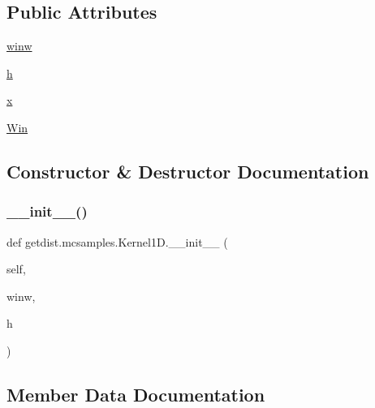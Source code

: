 \subsection*{Public Attributes}
\begin{DoxyCompactItemize}
\item 
\mbox{\hyperlink{classgetdist_1_1mcsamples_1_1Kernel1D_a897ce9e9a0b0f403e8d6111badf3a2cf}{winw}}
\item 
\mbox{\hyperlink{classgetdist_1_1mcsamples_1_1Kernel1D_a95db9c9ddddc733eace8160174ec27dd}{h}}
\item 
\mbox{\hyperlink{classgetdist_1_1mcsamples_1_1Kernel1D_a8b93d07c294c35dbff6871069a05c16c}{x}}
\item 
\mbox{\hyperlink{classgetdist_1_1mcsamples_1_1Kernel1D_a9c7890245179ab18b53b4396ed95a7fc}{Win}}
\end{DoxyCompactItemize}


\subsection{Constructor \& Destructor Documentation}
\mbox{\label{classgetdist_1_1mcsamples_1_1Kernel1D_ac73176fb74e465d22387b301fbf66a32}} 
\subsubsection{\texorpdfstring{\+\_\+\+\_\+init\+\_\+\+\_\+()}{\_\_init\_\_()}}
{\footnotesize\ttfamily def getdist.\+mcsamples.\+Kernel1\+D.\+\_\+\+\_\+init\+\_\+\+\_\+ (\begin{DoxyParamCaption}\item[{}]{self,  }\item[{}]{winw,  }\item[{}]{h }\end{DoxyParamCaption})}



\subsection{Member Data Documentation}
\mbox{\label{classgetdist_1_1mcsamples_1_1Kernel1D_a95db9c9ddddc733eace8160174ec27dd}} 
